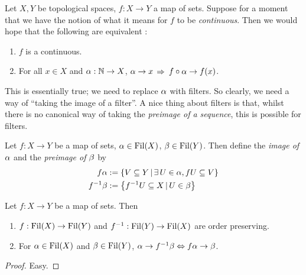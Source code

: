 \documentclass[main.tex]{subfiles}
\begin{document}
\begin{rmk}
  
  Let $X, Y$ be topological spaces, $f : X \to Y$ a map of sets. 
  Suppose for a moment that we have the notion of 
  what it means for $f$ to be \emph{continuous}.
  Then we would hope that the following are equivalent : 
  \begin{enumerate}
    \item $f$ is a continuous.
    \item For all $x \in X$ and $\alpha : \mathbb{N} \to X$,
    $\alpha \to x$ $\Rightarrow$
    $f \circ \alpha \to f(x)$.
  \end{enumerate}
  This is essentially true; we need to replace $\alpha$ with filters.
  So clearly, we need a way of ``taking the image of a filter''. 
  A nice thing about filters is that,
  whilst there is no canonical way of taking the 
  \emph{preimage of a sequence}, 
  this is possible for filters.
\end{rmk}

\begin{dfn}

  Let $f : X \to Y$ be a map of sets, $\alpha \in \operatorname{Fil}(X)$, $\beta \in \operatorname{Fil}(Y)$. 
  Then define the \emph{image of $\alpha$} and the \emph{preimage of $\beta$}
  by \begin{align*}
    f \alpha &:= \left\{V \subseteq Y \,|\, \exists\,U \in \alpha, f U \subseteq V\right\} \\
    f^{-1} \beta &:= \left\{f^{-1}U \subseteq X \,|\, U \in \beta\right\}
  \end{align*}
\end{dfn}

\begin{prop}

  Let $f : X \to Y$ be a map of sets. 
  Then \begin{enumerate}
    \item $f : \operatorname{Fil}(X) \to \operatorname{Fil}(Y)$ and $f^{-1} : \operatorname{Fil}(Y) \to \operatorname{Fil}(X)$
    are order preserving.
    \item For $\alpha \in \operatorname{Fil}(X)$ and $\beta \in \operatorname{Fil}(Y)$, 
    $\alpha \to f^{-1}\beta \Leftrightarrow f\alpha \to \beta$.
  \end{enumerate}
\end{prop}
\begin{proof} 
  Easy. 
\end{proof}
\end{document}
